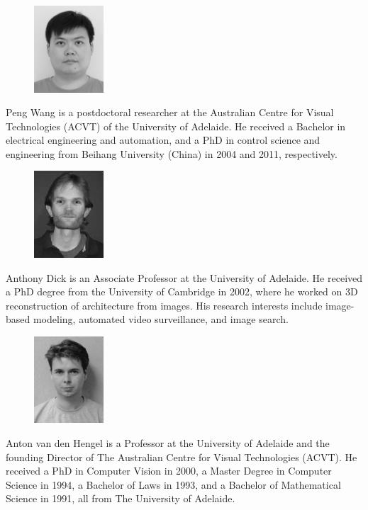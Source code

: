 \documentclass[10pt,journal,compsoc]{IEEEtran}
\begin{document}
\vspace{-1cm}
\begin{figure}
\vspace{-10pt}
  \includegraphics[width=7em]{author-wang_bw.jpg}
\end{figure}
\begin{IEEEbiographynophoto}{Peng Wang}
is a postdoctoral researcher at the Australian Centre for Visual Technologies (ACVT) of the University of Adelaide. He received a Bachelor in electrical engineering and automation, and a PhD in control science and engineering from Beihang University (China) in 2004 and 2011, respectively.
\end{IEEEbiographynophoto}

\vspace{-0.5cm}
\begin{figure}
\vspace{-10pt}
  \includegraphics[width=7em]{author-dick.png}
\end{figure}
\begin{IEEEbiographynophoto}{Anthony Dick}
is an Associate Professor at the University of Adelaide. He
received a PhD degree from the University of Cambridge in 2002, where he worked on 3D reconstruction of architecture from images. His research interests include image-based modeling, automated video surveillance, and image search.
\end{IEEEbiographynophoto}

\vspace{-0.5cm}
\begin{figure}
\vspace{-10pt}
  \includegraphics[width=7em]{author-hengel.png}
\end{figure}
\begin{IEEEbiographynophoto}{Anton van den Hengel}
is a Professor at the University of Adelaide and the founding Director of The Australian Centre for Visual Technologies (ACVT). He received a PhD in Computer Vision in 2000, a Master Degree in Computer Science in 1994, a Bachelor of Laws in 1993, and a Bachelor of Mathematical Science in 1991, all from The University of Adelaide.
\end{IEEEbiographynophoto}
\end{document}
